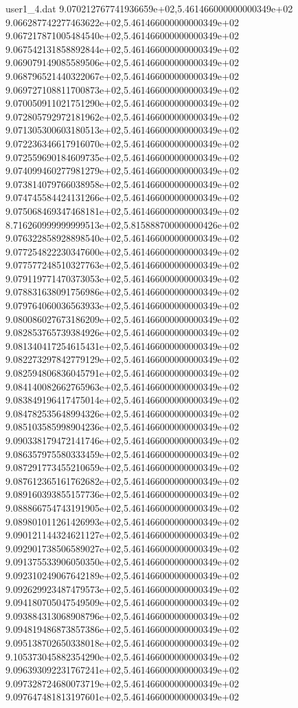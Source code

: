 \begin{filecontents}{user1_4.dat}
9.070212767741936659e+02,5.461466000000000349e+02
9.066287742277463622e+02,5.461466000000000349e+02
9.067217871005484540e+02,5.461466000000000349e+02
9.067542131858892844e+02,5.461466000000000349e+02
9.069079149085589506e+02,5.461466000000000349e+02
9.068796521440322067e+02,5.461466000000000349e+02
9.069727108811700873e+02,5.461466000000000349e+02
9.070050911021751290e+02,5.461466000000000349e+02
9.072805792972181962e+02,5.461466000000000349e+02
9.071305300603180513e+02,5.461466000000000349e+02
9.072236346617916070e+02,5.461466000000000349e+02
9.072559690184609735e+02,5.461466000000000349e+02
9.074099460277981279e+02,5.461466000000000349e+02
9.073814079766038958e+02,5.461466000000000349e+02
9.074745584424131266e+02,5.461466000000000349e+02
9.075068469347468181e+02,5.461466000000000349e+02
8.716260999999999513e+02,5.815888700000000426e+02
9.076322858928898540e+02,5.461466000000000349e+02
9.077254822230347600e+02,5.461466000000000349e+02
9.077577248510327763e+02,5.461466000000000349e+02
9.079119771470373053e+02,5.461466000000000349e+02
9.078831638091756986e+02,5.461466000000000349e+02
9.079764060036563933e+02,5.461466000000000349e+02
9.080086027673186209e+02,5.461466000000000349e+02
9.082853765739384926e+02,5.461466000000000349e+02
9.081340417254615431e+02,5.461466000000000349e+02
9.082273297842779129e+02,5.461466000000000349e+02
9.082594806836045791e+02,5.461466000000000349e+02
9.084140082662765963e+02,5.461466000000000349e+02
9.083849196417475014e+02,5.461466000000000349e+02
9.084782535648994326e+02,5.461466000000000349e+02
9.085103585998904236e+02,5.461466000000000349e+02
9.090338179472141746e+02,5.461466000000000349e+02
9.086357975580333459e+02,5.461466000000000349e+02
9.087291773455210659e+02,5.461466000000000349e+02
9.087612365161762682e+02,5.461466000000000349e+02
9.089160393855157736e+02,5.461466000000000349e+02
9.088866754743191905e+02,5.461466000000000349e+02
9.089801011261426993e+02,5.461466000000000349e+02
9.090121144324621127e+02,5.461466000000000349e+02
9.092901738506589027e+02,5.461466000000000349e+02
9.091375533906050350e+02,5.461466000000000349e+02
9.092310249067642189e+02,5.461466000000000349e+02
9.092629923487479573e+02,5.461466000000000349e+02
9.094180705047549509e+02,5.461466000000000349e+02
9.093884313068908796e+02,5.461466000000000349e+02
9.094819486873857386e+02,5.461466000000000349e+02
9.095138702650338018e+02,5.461466000000000349e+02
9.105373045882354290e+02,5.461466000000000349e+02
9.096393092231767241e+02,5.461466000000000349e+02
9.097328724680073719e+02,5.461466000000000349e+02
9.097647481813197601e+02,5.461466000000000349e+02

\end{filecontents}
